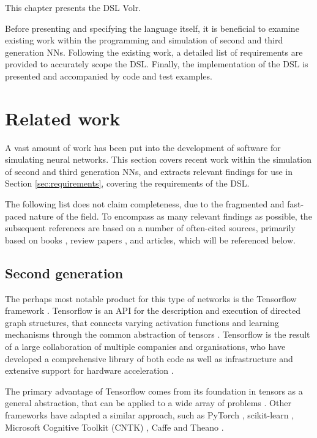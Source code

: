 \documentclass[report.tex]{subfiles}
\begin{document}
This chapter presents the \gls{DSL} Volr. 

Before presenting and specifying the language itself, 
it is beneficial to examine existing work within the
programming and simulation of second and third
generation \glspl{NN}.
Following the existing work, a detailed list of requirements
are provided to accurately scope the \gls{DSL}.
Finally, the implementation of the \gls{DSL} is presented and
accompanied by code and test examples.

\section{Related work}
A vast amount of work has been put into the development of software for simulating
neural networks.
This section covers recent work within the simulation of second and third
generation \glspl{NN}, and extracts relevant findings for use in 
Section \ref{sec:requirements}, covering the requirements of the DSL.

The following list does not claim completeness, due to the fragmented and 
fast-paced nature of the field.
To encompass as many relevant findings as possible, the subsequent
references are based on a number of often-cited sources, primarily based on books
\cite{Bishop2006, Russel2007, Eliasmith2015, Lin2018, Nilsson2009, Pearl1988, Rojas1996, Rumelhart1988}, review papers 
\cite{Schmidhuber2014, Blundell2018, Markram2013, Walter2015, Hunsberger2015},
and articles, which will be referenced below.

\subsection{Second generation}
The perhaps most notable product for this type of networks is the Tensorflow 
framework \cite{Abadi2016}.
Tensorflow is an \gls{API} for the description and execution of directed graph 
structures,
that connects varying activation functions and learning mechanisms through the common abstraction
of tensors \cite{Abadi2015}.
Tensorflow is the result of a large collaboration of multiple companies and organisations, who have
developed a comprehensive library of both code as well as infrastructure and extensive support for hardware acceleration \cite{Abadi2015}.

The primary advantage of Tensorflow  comes from 
its foundation in tensors as a general abstraction, that
can be applied to a wide array of problems \cite{Abadi2016}.
Other frameworks have adapted a similar approach, such as PyTorch \cite{PyTorch2018}, 
scikit-learn \cite{Sklearn2018}, Microsoft Cognitive Toolkit (CNTK) \cite{CNTK2018},
Caffe \cite{Caffe2018} and Theano \cite{Theano2018}.
\end{document}
